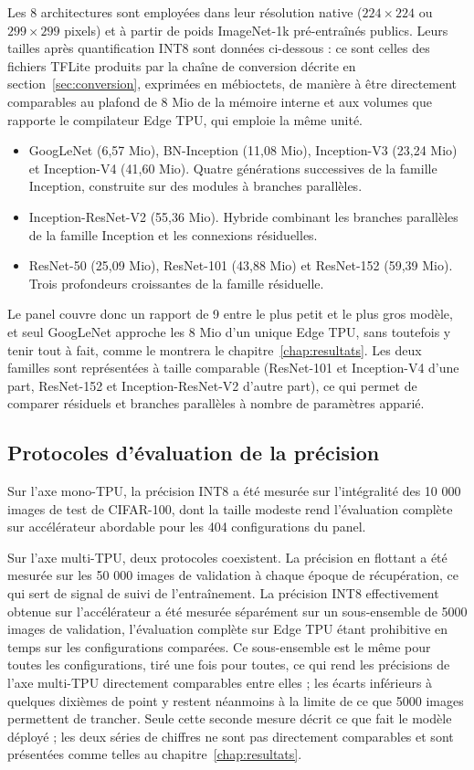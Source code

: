 \documentclass[11pt,a4paper]{report}
\begin{document}
Les 8 architectures sont employées dans leur résolution native ($224 \times 224$ ou $299 \times 299$ pixels) et à partir de poids ImageNet-1k pré-entraînés publics. Leurs tailles après quantification INT8 sont données ci-dessous : ce sont celles des fichiers TFLite produits par la chaîne de conversion décrite en section~\ref{sec:conversion}, exprimées en mébioctets, de manière à être directement comparables au plafond de 8 Mio de la mémoire interne et aux volumes que rapporte le compilateur Edge TPU, qui emploie la même unité.

\begin{itemize}
  \item GoogLeNet (6,57 Mio), BN-Inception (11,08 Mio), Inception-V3 (23,24 Mio) et Inception-V4 (41,60 Mio). Quatre générations successives de la famille Inception, construite sur des modules à branches parallèles.
  \item Inception-ResNet-V2 (55,36 Mio). Hybride combinant les branches parallèles de la famille Inception et les connexions résiduelles.
  \item ResNet-50 (25,09 Mio), ResNet-101 (43,88 Mio) et ResNet-152 (59,39 Mio). Trois profondeurs croissantes de la famille résiduelle.
\end{itemize}

Le panel couvre donc un rapport de 9 entre le plus petit et le plus gros modèle, et seul GoogLeNet approche les 8 Mio d'un unique Edge TPU, sans toutefois y tenir tout à fait, comme le montrera le chapitre~\ref{chap:resultats}. Les deux familles sont représentées à taille comparable (ResNet-101 et Inception-V4 d'une part, ResNet-152 et Inception-ResNet-V2 d'autre part), ce qui permet de comparer résiduels et branches parallèles à nombre de paramètres apparié.

\subsection{Protocoles d'évaluation de la précision}

Sur l'axe mono-TPU, la précision INT8 a été mesurée sur l'intégralité des 10 000 images de test de CIFAR-100, dont la taille modeste rend l'évaluation complète sur accélérateur abordable pour les 404 configurations du panel.

Sur l'axe multi-TPU, deux protocoles coexistent. La précision en flottant a été mesurée sur les 50 000 images de validation à chaque époque de récupération, ce qui sert de signal de suivi de l'entraînement. La précision INT8 effectivement obtenue sur l'accélérateur a été mesurée séparément sur un sous-ensemble de 5000 images de validation, l'évaluation complète sur Edge TPU étant prohibitive en temps sur les configurations comparées. Ce sous-ensemble est le même pour toutes les configurations, tiré une fois pour toutes, ce qui rend les précisions de l'axe multi-TPU directement comparables entre elles ; les écarts inférieurs à quelques dixièmes de point y restent néanmoins à la limite de ce que 5000 images permettent de trancher. Seule cette seconde mesure décrit ce que fait le modèle déployé ; les deux séries de chiffres ne sont pas directement comparables et sont présentées comme telles au chapitre~\ref{chap:resultats}.
\end{document}

